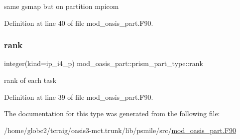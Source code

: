 same gsmap but on partition mpicom 



Definition at line 40 of file mod\+\_\+oasis\+\_\+part.\+F90.

\mbox{\label{structmod__oasis__part_1_1prism__part__type_a1bf56b7dcc55c07cab5d1be13d33cfdd}} 
\subsubsection{\texorpdfstring{rank}{rank}}
{\footnotesize\ttfamily integer(kind=ip\+\_\+i4\+\_\+p) mod\+\_\+oasis\+\_\+part\+::prism\+\_\+part\+\_\+type\+::rank\hspace{0.3cm}{\ttfamily [private]}}



rank of each task 



Definition at line 39 of file mod\+\_\+oasis\+\_\+part.\+F90.



The documentation for this type was generated from the following file\+:\begin{DoxyCompactItemize}
\item 
/home/globc2/tcraig/oasis3-\/mct.\+trunk/lib/psmile/src/\hyperlink{mod__oasis__part_8_f90}{mod\+\_\+oasis\+\_\+part.\+F90}\end{DoxyCompactItemize}
